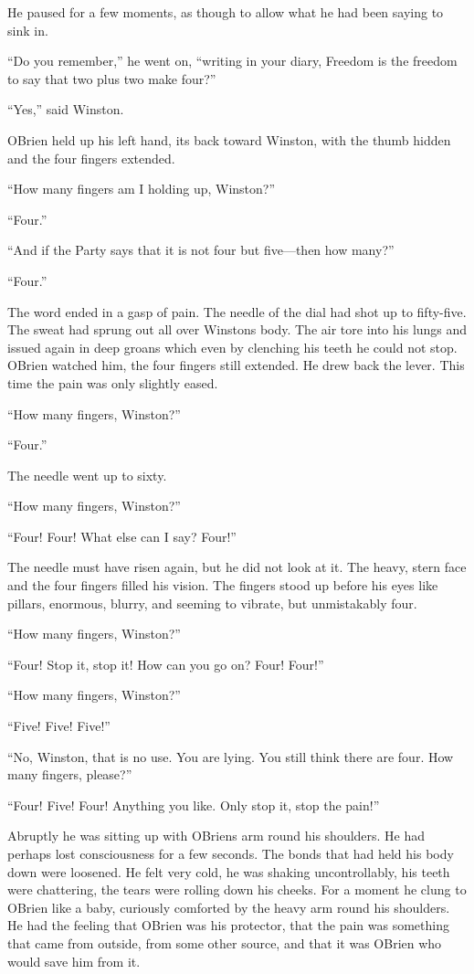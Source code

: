 He paused for a few moments, as though to allow what he had been saying
to sink in.

``Do you remember,'' he went on, ``writing in your diary,
\textquotesingle Freedom is the freedom to say that two plus two make
four\textquotesingle?''

``Yes,'' said Winston.

O\textquotesingle Brien held up his left hand, its back toward Winston,
with the thumb hidden and the four fingers extended.

``How many fingers am I holding up, Winston?''

``Four.''

``And if the Party says that it is not four but five---then how many?''

``Four.''

The word ended in a gasp of pain. The needle of the dial had shot up to
fifty-five. The sweat had sprung out all over Winston\textquotesingle s
body. The air tore into his lungs and issued again in deep groans which
even by clenching his teeth he could not stop. O\textquotesingle Brien
watched him, the four fingers still extended. He drew back the lever.
This time the pain was only slightly eased.

``How many fingers, Winston?''

``Four.''

The needle went up to sixty.

``How many fingers, Winston?''

``Four! Four! What else can I say? Four!''

The needle must have risen again, but he did not look at it. The heavy,
stern face and the four fingers filled his vision. The fingers stood up
before his eyes like pillars, enormous, blurry, and seeming to vibrate,
but unmistakably four.

``How many fingers, Winston?''

``Four! Stop it, stop it! How can you go on? Four! Four!''

``How many fingers, Winston?''

``Five! Five! Five!''

``No, Winston, that is no use. You are lying. You still think there are
four. How many fingers, please?''

``Four! Five! Four! Anything you like. Only stop it, stop the pain!''

Abruptly he was sitting up with
O\textquotesingle Brien\textquotesingle s arm round his shoulders. He
had perhaps lost consciousness for a few seconds. The bonds that had
held his body down were loosened. He felt very cold, he was shaking
uncontrollably, his teeth were chattering, the tears were rolling down
his cheeks. For a moment he clung to O\textquotesingle Brien like a
baby, curiously comforted by the heavy arm round his shoulders. He had
the feeling that O\textquotesingle Brien was his protector, that the
pain was something that came from outside, from some other source, and
that it was O\textquotesingle Brien who would save him from it.

